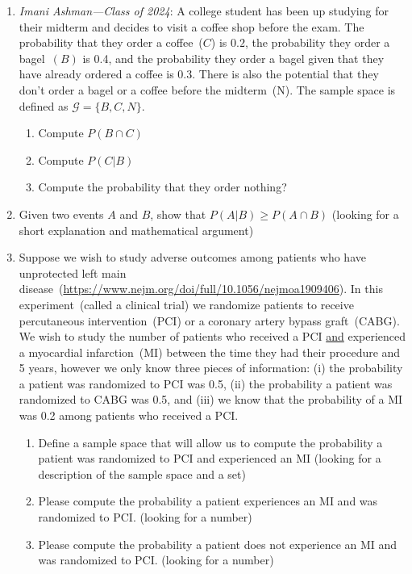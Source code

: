 \begin{enumerate}
   \item \textit{Imani Ashman---Class of 2024}: A college student has been up studying for their midterm and decides to visit a coffee shop before the exam. The probability that they order a coffee~($C$) is $0.2$, the probability they order a bagel~$(B)$ is 0.4, and the probability they order a bagel given that they have already ordered a coffee is 0.3. There is also the potential that they don't order a bagel or a coffee before the midterm~(N). The sample space is defined as $\mathcal{G}= \{B,C,N\}$.
   \begin{enumerate}
       \item Compute $P(B \cap C)$ 
       \item Compute $P(C | B)$
       \item Compute the probability that they order nothing?
   \end{enumerate}
   
   \item Given two events $A$ and $B$, show that $P(A|B) \geq P(A \cap B)$ (looking for a short explanation and mathematical argument)
   
   

   \item Suppose we wish to study adverse outcomes among patients who have unprotected left main disease~(\url{https://www.nejm.org/doi/full/10.1056/nejmoa1909406}). In this experiment~(called a clinical trial) we randomize patients to receive percutaneous intervention~(PCI) or a coronary artery bypass graft~(CABG). We wish to study the number of patients who received a PCI \underline{and} experienced a myocardial infarction~(MI) between the time they had their procedure and 5 years, however we only know three pieces of information: (i) the probability a patient was randomized to PCI was 0.5, (ii) the probability a patient was randomized to CABG was 0.5, and (iii) we know that the probability of a MI was 0.2 among patients who received a PCI.
   \begin{enumerate}
       \item Define a sample space that will allow us to compute the probability a patient was randomized to PCI and experienced an MI (looking for a description of the sample space and a set)
       \item Please compute the probability a patient experiences an MI and was randomized to PCI. (looking for a number)
       \item Please compute the probability a patient does not experience an MI and was randomized to PCI. (looking for a number)
   \end{enumerate}
   

\end{enumerate}
